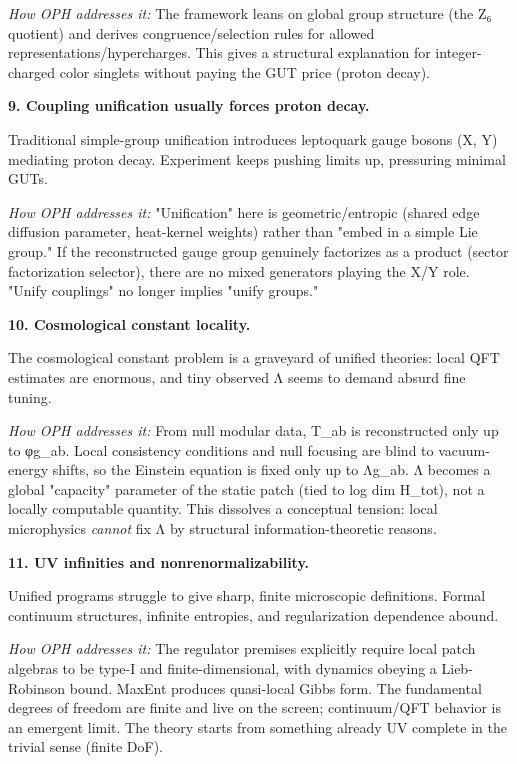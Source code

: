 \emph{How OPH addresses it:} The framework leans on global group structure (the Z₆ quotient) and derives congruence/selection rules for allowed representations/hypercharges. This gives a structural explanation for integer-charged color singlets without paying the GUT price (proton decay).

\textbf{9. Coupling unification usually forces proton decay.}

Traditional simple-group unification introduces leptoquark gauge bosons (X, Y) mediating proton decay. Experiment keeps pushing limits up, pressuring minimal GUTs.

\emph{How OPH addresses it:} "Unification" here is geometric/entropic (shared edge diffusion parameter, heat-kernel weights) rather than "embed in a simple Lie group." If the reconstructed gauge group genuinely factorizes as a product (sector factorization selector), there are no mixed generators playing the X/Y role. "Unify couplings" no longer implies "unify groups."

\textbf{10. Cosmological constant locality.}

The cosmological constant problem is a graveyard of unified theories: local QFT estimates are enormous, and tiny observed Λ seems to demand absurd fine tuning.

\emph{How OPH addresses it:} From null modular data, T\_ab is reconstructed only up to φg\_ab. Local consistency conditions and null focusing are blind to vacuum-energy shifts, so the Einstein equation is fixed only up to Λg\_ab. Λ becomes a global "capacity" parameter of the static patch (tied to log dim H\_tot), not a locally computable quantity. This dissolves a conceptual tension: local microphysics \emph{cannot} fix Λ by structural information-theoretic reasons.

\textbf{11. UV infinities and nonrenormalizability.}

Unified programs struggle to give sharp, finite microscopic definitions. Formal continuum structures, infinite entropies, and regularization dependence abound.

\emph{How OPH addresses it:} The regulator premises explicitly require local patch algebras to be type-I and finite-dimensional, with dynamics obeying a Lieb-Robinson bound. MaxEnt produces quasi-local Gibbs form. The fundamental degrees of freedom are finite and live on the screen; continuum/QFT behavior is an emergent limit. The theory starts from something already UV complete in the trivial sense (finite DoF).

